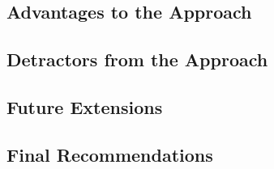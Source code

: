 \documentclass[11pt]{article} %
\begin{document}
\subsection{Advantages to the Approach}
\label{sec:pros}

\subsection{Detractors from the Approach}
\label{sec:cons}

\subsection{Future Extensions}
\label{sec:extensions}

\subsection{Final Recommendations}
\label{sec:final}


\newpage




\end{document}
